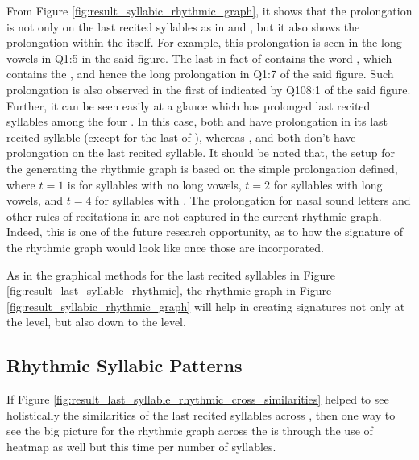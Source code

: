 From Figure \ref{fig:result_syllabic_rhythmic_graph}, it shows that the prolongation is not only on the last recited syllables as in   and  , but it also shows the prolongation within the   itself. For example, this prolongation is seen in the long vowels in Q1:5 in the said figure. The last   in fact of   contains the word  , which contains the  , and hence the long prolongation in Q1:7 of the said figure. Such prolongation is also observed in the first   of   indicated by Q108:1 of the said figure. Further, it can be seen easily at a glance which   has prolonged last recited syllables among the four  . In this case, both   and   have prolongation in its last recited syllable (except for the last   of  ), whereas  , and   both don't have prolongation on the last recited syllable. It should be noted that, the setup for the generating the rhythmic graph is based on the simple prolongation defined, where $t=1$ is for syllables with no long vowels, $t=2$ for syllables with long vowels, and $t=4$ for syllables with  . The prolongation for nasal sound letters and other rules of recitations in   are not captured in the current rhythmic graph. Indeed, this is one of the future research opportunity, as to how the signature of the rhythmic graph would look like once those are incorporated.

As in the graphical methods for the last recited syllables in Figure \ref{fig:result_last_syllable_rhythmic}, the rhythmic graph in Figure \ref{fig:result_syllabic_rhythmic_graph} will help in creating signatures not only at the   level, but also down to the   level. 

\subsection{Rhythmic Syllabic Patterns}
If Figure \ref{fig:result_last_syllable_rhythmic_cross_similarities} helped to see holistically the similarities of the last recited syllables across  , then one way to see the big picture for the rhythmic graph across the   is through the use of heatmap as well but this time per number of syllables.

